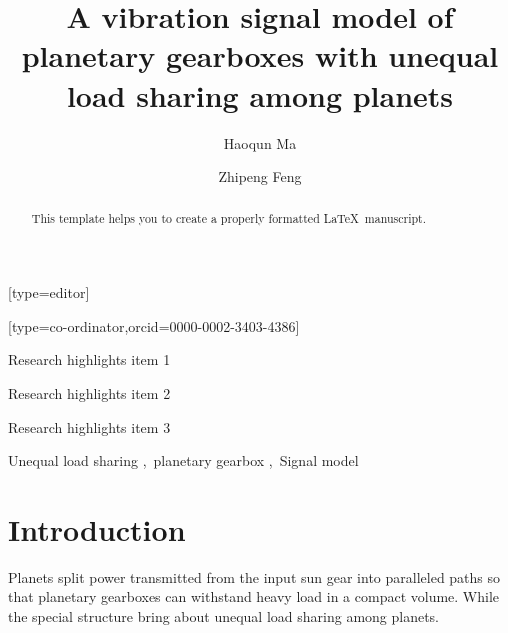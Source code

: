 \documentclass[a4paper]{cas-sc}%
\begin{document}
\let\WriteBookmarks\relax
\def\floatpagepagefraction{1}
\def\textpagefraction{.001}

\title[mode = title]{A vibration signal model of planetary gearboxes with unequal load sharing among planets}
\author[1]{Haoqun Ma}[type=editor]
\address[1]{University of Science and Technology Beijing, No.30, Xueyuan Road, Haidian District, Beijing.}
\author[1]{Zhipeng Feng}[type=co-ordinator,orcid=0000-0002-3403-4386]
\cormark[1]
\begin{abstract}
    This template helps you to create a properly formatted \LaTeX\ manuscript.
\end{abstract}
\begin{highlights}
    \item Research highlights item 1
    \item Research highlights item 2
    \item Research highlights item 3
\end{highlights}
\begin{keywords}
    Unequal load sharing \sep\ planetary gearbox \sep\ Signal model
\end{keywords}
    
\maketitle
\section{Introduction}
\par Planets split power transmitted from the input sun gear into paralleled paths so that planetary gearboxes can withstand heavy load in a compact volume. While the special structure bring about unequal load sharing among planets.
\end{document}
